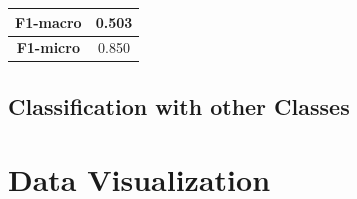 \begin{center}
	\begin{tabular}{ | c | c | } 
		\hline
		\textbf{F1-macro} & 0.503 \\
		\hline
		\textbf{F1-micro} & 0.850 \\ 
		\hline
	\end{tabular}
\end{center}



\subsection{Classification with other Classes}


\section{Data Visualization}